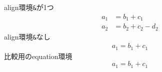 
\usepackage{amsmath}

align環境\texttt{\&}が1つ %
\begin{align}
  a_1 &= b_1+c_1\\
  a_2 &= b_2+c_2-d_2
\end{align}
align環境\texttt{\&}なし %
\begin{align}
  a_1=b_1+c_1
\end{align}
比較用のequation環境
\begin{equation}
  a_1=b_1+c_1
\end{equation}

